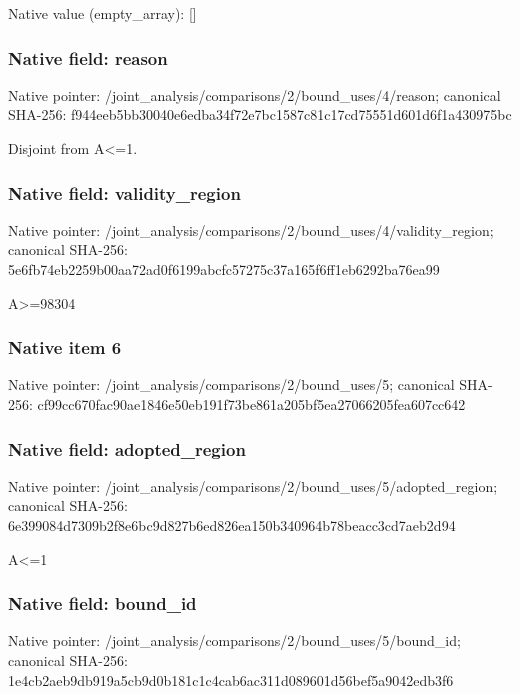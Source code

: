\documentclass[10pt,a4paper]{article}
\begin{document}
Native value (empty\_\allowbreak{}array): []

\subsubsection{Native field: reason}
Native pointer: /joint\_\allowbreak{}analysis/comparisons/2/bound\_\allowbreak{}uses/4/reason; canonical SHA-256: f944eeb5bb30040e6edba34f72e7bc1587c81c17cd75551d601d6f1a430975bc

\begingroup\raggedright\sloppy Disjoint from A<=\allowbreak{}1.\par\endgroup

\subsubsection{Native field: validity\_\allowbreak{}region}
Native pointer: /joint\_\allowbreak{}analysis/comparisons/2/bound\_\allowbreak{}uses/4/validity\_\allowbreak{}region; canonical SHA-256: 5e6fb74eb2259b00aa72ad0f6199abcfc57275c37a165f6ff1eb6292ba76ea99

\begingroup\raggedright\sloppy A>=\allowbreak{}98304\par\endgroup

\subsubsection{Native item 6}
Native pointer: /joint\_\allowbreak{}analysis/comparisons/2/bound\_\allowbreak{}uses/5; canonical SHA-256: cf99cc670fac90ae1846e50eb191f73be861a205bf5ea27066205fea607cc642

\subsubsection{Native field: adopted\_\allowbreak{}region}
Native pointer: /joint\_\allowbreak{}analysis/comparisons/2/bound\_\allowbreak{}uses/5/adopted\_\allowbreak{}region; canonical SHA-256: 6e399084d7309b2f8e6bc9d827b6ed826ea150b340964b78beacc3cd7aeb2d94

\begingroup\raggedright\sloppy A<=\allowbreak{}1\par\endgroup

\subsubsection{Native field: bound\_\allowbreak{}id}
Native pointer: /joint\_\allowbreak{}analysis/comparisons/2/bound\_\allowbreak{}uses/5/bound\_\allowbreak{}id; canonical SHA-256: 1e4cb2aeb9db919a5cb9d0b181c1c4cab6ac311d089601d56bef5a9042edb3f6
\end{document}
